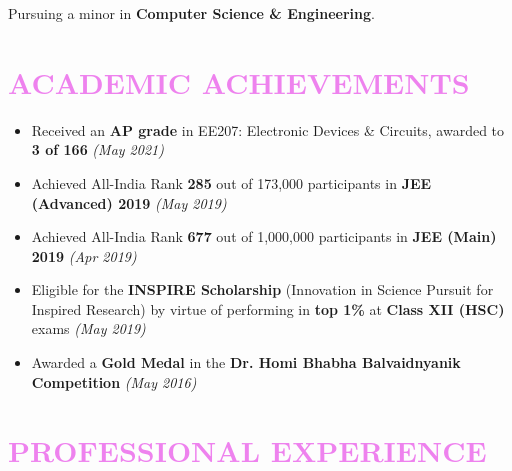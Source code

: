 \documentclass[a4paper,11pt]{article}
\begin{document}
\vspace*{45mm}

Pursuing a minor in \textbf{Computer Science \& Engineering}.
\vspace{-4mm}

\section{\textcolor{Violet}{\textbf{\Large{A}\large{CADEMIC} \Large{A}\large{CHIEVEMENTS}}}}
\vspace{-5pt}
\begin{itemize}[noitemsep]
    \item Received an \textbf{AP grade} in EE207: Electronic Devices \& Circuits, awarded to \textbf{3 of 166} \hfill \emph{(May 2021)} 
    \item Achieved All-India Rank \textbf{285} out of 173,000 participants in \textbf{JEE (Advanced) 2019} \hfill \emph{(May 2019)}
    \item Achieved All-India Rank \textbf{677} out of 1,000,000 participants in \textbf{JEE (Main) 2019} \hfill \emph{(Apr 2019)}
    \item Eligible for the \textbf{INSPIRE Scholarship} (Innovation in Science Pursuit for Inspired Research) by virtue of performing in \textbf{top 1\%} at \textbf{Class XII (HSC)} exams \hfill \emph{(May 2019)}
    \item Awarded a \textbf{Gold Medal} in the \textbf{Dr. Homi Bhabha Balvaidnyanik Competition} \hfill \emph{(May 2016)}
\end{itemize}
\vspace{-7mm}

\section{\textcolor{Violet}{\textbf{\Large{P}\large{ROFESSIONAL} \Large{E}\large{XPERIENCE}}}}
\vspace{-5pt}
\end{document}
